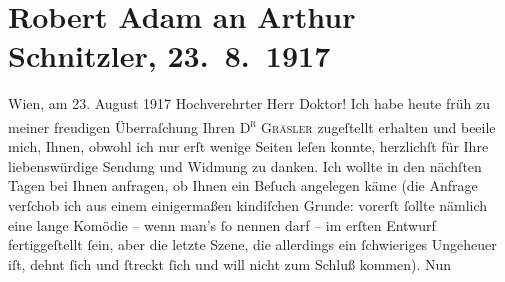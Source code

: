 

         \newcommand{\erwaehnteOrte}{Orte: Wien}
         \newcommand{\erwaehnteWerke}{Werke: Das Ende des Judas, Doktor Gräsler, Badearzt, Don Quijote}
               \section[Robert Adam an Arthur Schnitzler, 23. 8. 1917]{ Robert Adam an Arthur Schnitzler, 23. 8. 1917}\nopagebreak{}\rehead{ }\begin{ledgroupsized}[t]{13cm}\normalsize\beginnumbering \toendnotes[C]{\smallbreak\pagebreak[2]} 
\toendnotes[C]{\smallbreak}\pstart
           \raggedleft{}{\pb}Wien, am 23. August 1917\pend
           \pstart{}Hochverehrter Herr Doktor!\pend\pstart
           Ich habe heute früh zu meiner freudigen Überraſchung Ihren \textsc{D\textsuperscript{r}{ }Gräsler} zugeſtellt erhalten und beeile mich, Ihnen, obwohl ich nur erſt wenige
                    Seiten leſen konnte, herzlichſt für Ihre liebenswürdige Sendung und Widmung zu
                    danken.\pend
           \pstart
           Ich wollte in den nächſten Tagen bei Ihnen anfragen, ob Ihnen ein Beſuch
                    angelegen käme (die Anfrage verſchob ich aus einem einigermaßen kindiſchen
                    Grunde: vorerſt ſollte nämlich eine lange Komödie – wenn man’s ſo  nennen darf – im erſten Entwurf fertiggeſtellt ſein, aber die
                    letzte Szene, die allerdings ein ſchwieriges Unge{\pb}heuer iſt, dehnt ſich und ſtreckt ſich und will nicht zum Schluß kommen). Nun

\end{ledgroupsized}
